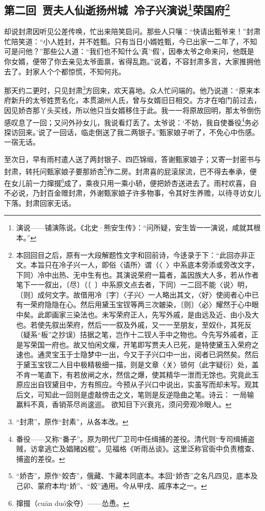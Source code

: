 \subsection*{第二回\ 贾夫人仙逝扬州城\ 冷子兴演说\footnote{演说——铺演陈说。《北史·熊安生传》：“问所疑，安生皆一一演说，咸就其根本。”}荣国府\footnote{本回回目之后，原有一大段解题性文字和回前诗，今迻录于下：“此回亦非正文。本旨只在冷子兴一人，即俗〈语所〉谓（〈\ 〉中系底本旁添或旁改文字，下同）冷中出热、无中生有也。其演说荣府一篇者，盖因族大人多，若从作者笔下一一叙出，〔尽〕（〔\ 〕中系原文点去者，下同）一二回不能〈说〉明，〔则〕成何文字。故借用冷〔字〕〈子兴〉一人略出其文，〈好〉使阅者心中已有一荣府隐隐在心。然后用黛玉宝钗等两三次皴染，〔则〕〈必〉耀然于心中眼中矣。此即画家三染法也。未写荣府正人，先写外戚，是由远及近、由小及大也。若使先叙出荣府，然后一一叙及外戚，又一一至朋友，至奴仆，其死反（疑系“板”之抄误）拮据之笔，岂作十二钗人手中之物也。今先写外戚者，正是写荣国一府也。故又怕闲文\BingZhui 瘰，开笔即写贾夫人已死，是特使黛玉入荣府之速也。通灵宝玉于士隐梦中一出，今又于子兴口中一出，阅者已洞然矣。然后于黛玉宝钗二人目中极精极细一描，则是文章〈关〉锁何（此字疑衍）处，盖不肯一笔直下，有若放闸之水，然信之爆，使其精华一泄而无馀也。究竟此玉原应出自钗黛目中，方有照应。今预从子兴口中说出，实虽写而却未写。观其后文，可知此一回则是虚敲傍击之文，笔则是反逆隐曲之笔。诗云：
一局输赢料不真，香销茶尽尚逡巡。
欲知目下兴衰兆，须问旁观冷眼人。}}
\par 却说封肃因听见公差传唤，忙出来陪笑启问。那些人只嚷：“快请出甄爷来！”封肃忙陪笑道：“小人姓封，并不姓甄。只有当日小婿姓甄，今已出家一二年了，不知可是问他？”那些公人道：“我们也不知什么‘真’‘假’，因奉太爷之命来问，他既是你女婿，便带了你去亲见太爷面禀，省得乱跑。”说着，不容封肃多言，大家推拥他去了。封家人个个都惊慌，不知何兆。
\par 那天约二更时，只见封肃\footnote{“封肃”，原作“封素”，从各本改。}方回来，欢天喜地。众人忙问端的。他乃说道：“原来本府新升的太爷姓贾名化，本贯湖州人氏，曾与女婿旧日相交。方才在咱门前过去，因见娇杏那丫头买线，所以他只当女婿移住于此。我一一将原故回明，那太爷倒伤感叹息了一回；又问外孙女儿，我说看灯丢了。太爷说：‘不妨，我自使番役\footnote{番役——又称“番子”。原为明代厂卫司中任缉捕的差役。清代则“专司缉捕盗贼，访拿逃亡及娼赌凶棍”。见福格《听雨丛谈》。这里泛称官衙中负责稽查、捕盗的差役。}务必探访回来。’说了一回话，临走倒送了我二两银子。”甄家娘子听了，不免心中伤感。一宿无话。
\par 至次日，早有雨村遣人送了两封银子、四匹锦缎，答谢甄家娘子；又寄一封密书与封肃，转托问甄家娘子要那娇杏\footnote{“娇杏”，原作“姣杏”，俄藏、卞藏本同底本。本回“娇杏”之名凡四见，底本及己卯、蒙府本均“娇”、“姣”通用。今从甲戌、戚序本之一。}作二房。封肃喜的屁滚尿流，巴不得去奉承，便在女儿前一力撺掇\footnote{撺掇（cuān duó汆夺）——怂恿。}成了，乘夜只用一乘小轿，便把娇杏送进去了。雨村欢喜，自不必说，乃封百金赠封肃，外谢甄家娘子许多物事，令其好生养赡，以待寻访女儿下落。封肃回家无话。
